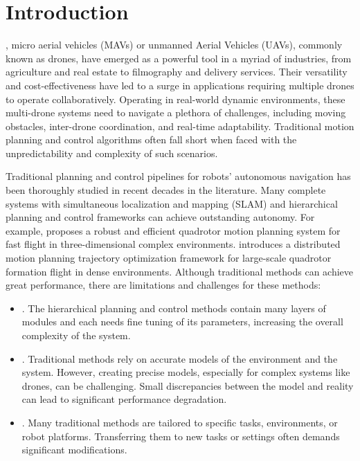\documentclass[letterpaper,journal,twoside]{IEEEtran}
\begin{document}
\section{Introduction}
, micro aerial vehicles (MAVs) or 
unmanned Aerial Vehicles (UAVs), commonly known as drones, 
have emerged as a powerful tool in a myriad of industries, 
from agriculture and real estate to filmography and delivery 
services. 
Their versatility and cost-effectiveness have led to a 
surge in applications requiring multiple drones to operate 
collaboratively. 
Operating in real-world dynamic environments, 
these multi-drone systems need to navigate a plethora of 
challenges, 
including moving obstacles, inter-drone coordination, and 
real-time adaptability. 
Traditional motion planning and control algorithms often fall 
short when faced with the unpredictability and complexity of such 
scenarios.

Traditional planning and control pipelines for robots' 
autonomous navigation has been thoroughly studied in recent
decades in the literature. 
Many complete systems with simultaneous localization 
and mapping (SLAM) and hierarchical 
planning and control frameworks can achieve outstanding 
autonomy.
For example, \cite{zhou2019robust} proposes a robust and efficient 
quadrotor motion planning system for fast flight in 
three-dimensional complex environments.
\cite{quan2023robust} introduces a distributed motion planning 
trajectory optimization framework for large-scale quadrotor 
formation flight in dense environments.
Although traditional methods can achieve great performance, 
there are limitations and challenges for these methods: 
\begin{itemize}
  \item {}. The hierarchical planning and control 
  methods contain many layers of modules and 
  each needs fine tuning of 
  its parameters, increasing the overall complexity of the system.
  \item {}. Traditional methods rely on 
  accurate models of the environment and the system. However, 
  creating precise models, especially for complex systems like 
  drones, can be challenging. Small discrepancies between the 
  model and reality can lead to significant performance 
  degradation. 
  \item {}. Many traditional methods are 
  tailored to specific tasks, environments, 
  or robot platforms. Transferring them 
  to new tasks or settings often demands significant 
  modifications. 
\end{itemize}
\end{document}

